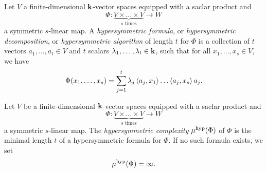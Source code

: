 \begin{defi}
Let $V$ a finite-dimensional $\mathbf{k}$-vector
spaces equipped with a saclar product and
\[
  \Phi:\underset{\textrm{$s$ times}}{\underbrace{V\times\dots\times V}}\to W
\]
a symmetric $s$-linear map. A \emph{hypersymmetric formula}, or
\emph{hypersymmetric decomposition}, or \emph{hypersymmetric algorithm} of length $t$ for $\Phi$ is a
collection of $t$ vectors $a_1, \dots, a_t\in V$ and $t$ scalars $\lambda_1,
\dots, \lambda_t\in\mathbf{k}$, such that for all $x_1, \dots, x_s\in
V$, we have
\[
  \Phi(x_1, \dots, x_s) =
  \sum_{j=1}^t\lambda_j\left\langle a_j,x_1\right\rangle\dots\left\langle a_j,x_s\right\rangle a_j.
\]
\end{defi}
\begin{defi}
Let $V$ be a finite-dimensional $\mathbf{k}$-vector spaces equipped with a saclar product
and
\[
  \Phi:\underset{\textrm{$s$ times}}{\underbrace{V\times\dots\times V}}\to W
\]
a symmetric $s$-linear map. The \emph{hypersymmetric complexity} $\mu^{\textrm{hyp}}(\Phi)$ of $\Phi$ is the
minimal length $t$ of a hypersymmetric formula for $\Phi$. If no such
formula exists, we set
\[
  \mu^{\textrm{hyp}}(\Phi) = \infty.
\]
\end{defi}

